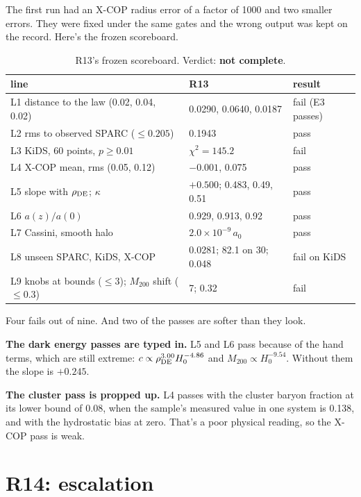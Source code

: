 The first run had an X-COP radius error of a factor of 1000 and two smaller errors. They were fixed under the same gates and the wrong output was kept on the record. Here's the frozen scoreboard.

\begin{table}[h]\centering\small
\begin{tabular}{@{}p{4.3cm}p{2.6cm}l@{}}
\toprule
line & R13 & result\\
\midrule
L1 distance to the law (0.02, 0.04, 0.02) & 0.0290, 0.0640, 0.0187 & fail (E3 passes)\\
L2 rms to observed SPARC ($\le0.205$) & 0.1943 & pass\\
L3 KiDS, 60 points, $p\ge0.01$ & $\chi^2=145.2$ & fail\\
L4 X-COP mean, rms (0.05, 0.12) & $-0.001$, 0.075 & pass\\
L5 slope with $\rho_{\rm DE}$; $\kappa$ & $+0.500$; 0.483, 0.49, 0.51 & pass\\
L6 $a(z)/a(0)$ & 0.929, 0.913, 0.92 & pass\\
L7 Cassini, smooth halo & $2.0\times10^{-9}\,a_0$ & pass\\
L8 unseen SPARC, KiDS, X-COP & 0.0281; 82.1 on 30; 0.048 & fail on KiDS\\
L9 knobs at bounds ($\le3$); $M_{200}$ shift ($\le0.3$) & 7; 0.32 & fail\\
\bottomrule
\end{tabular}
\caption{R13's frozen scoreboard. Verdict: \textbf{not complete}.}
\end{table}

Four fails out of nine. And two of the passes are softer than they look.



\textbf{The dark energy passes are typed in.} L5 and L6 pass because of the hand terms, which are still extreme: $c\propto\rho_{\rm DE}^{3.00}H_0^{-4.86}$ and $M_{200}\propto H_0^{-9.54}$. Without them the slope is $+0.245$.

\textbf{The cluster pass is propped up.} L4 passes with the cluster baryon fraction at its lower bound of 0.08, when the sample's measured value in one system is 0.138, and with the hydrostatic bias at zero. That's a poor physical reading, so the X-COP pass is weak.

\section{R14: escalation}

